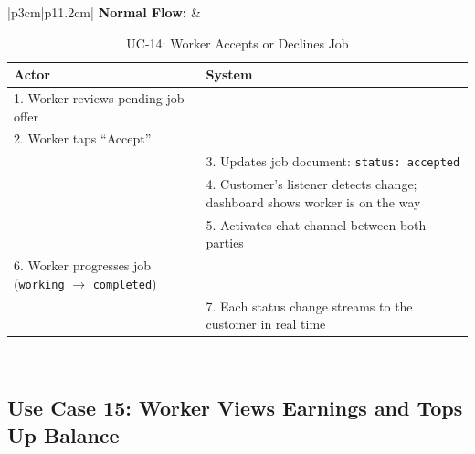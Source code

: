 {\small
\renewcommand{\arraystretch}{1.05}
\begin{table}[H]
\centering
\begin{tabular}{|p{3cm}|p{11.2cm}|}
\hline
\textbf{Normal Flow:} &
\begin{tabular}[t]{|p{5.4cm}|p{5.4cm}|}
\hline
\textbf{Actor} & \textbf{System} \\ \hline
1. Worker reviews pending job offer & \\ \hline
2. Worker taps ``Accept'' & \\ \hline
 & 3. Updates job document: \texttt{status: accepted} \\ \hline
 & 4. Customer's listener detects change; dashboard shows worker is on the way \\ \hline
 & 5. Activates chat channel between both parties \\ \hline
6. Worker progresses job (\texttt{working} $\rightarrow$ \texttt{completed}) & \\ \hline
 & 7. Each status change streams to the customer in real time \\ \hline
\end{tabular} \\ \hline
\end{tabular}
\caption{UC-14: Worker Accepts or Declines Job}
\end{table}
}

\newpage

\subsection*{Use Case 15: Worker Views Earnings and Tops Up Balance}

